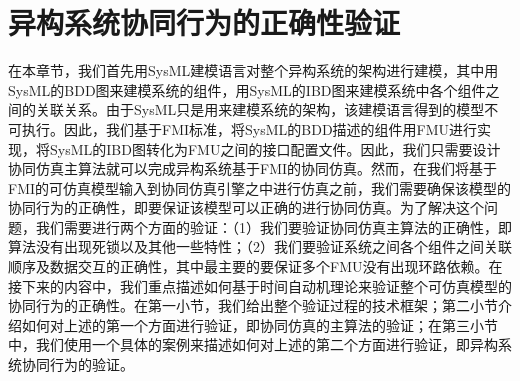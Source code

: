 \chapter{异构系统协同行为的正确性验证}
\label{ch3}
在本章节，我们首先用SysML建模语言对整个异构系统的架构进行建模，其中用SysML的BDD图来建模系统的组件，用SysML的IBD图来建模系统中各个组件之间的关联关系。由于SysML只是用来建模系统的架构，该建模语言得到的模型不可执行。因此，我们基于FMI标准，将SysML的BDD描述的组件用FMU进行实现，将SysML的IBD图转化为FMU之间的接口配置文件。因此，我们只需要设计协同仿真主算法就可以完成异构系统基于FMI的协同仿真。然而，在我们将基于FMI的可仿真模型输入到协同仿真引擎之中进行仿真之前，我们需要确保该模型的协同行为的正确性，即要保证该模型可以正确的进行协同仿真。为了解决这个问题，我们需要进行两个方面的验证：（1）我们要验证协同仿真主算法的正确性，即算法没有出现死锁以及其他一些特性；（2）我们要验证系统之间各个组件之间关联顺序及数据交互的正确性，其中最主要的要保证多个FMU没有出现环路依赖。在接下来的内容中，我们重点描述如何基于时间自动机理论来验证整个可仿真模型的协同行为的正确性。在第一小节，我们给出整个验证过程的技术框架；第二小节介绍如何对上述的第一个方面进行验证，即协同仿真的主算法的验证；在第三小节中，我们使用一个具体的案例来描述如何对上述的第二个方面进行验证，即异构系统协同行为的验证。
